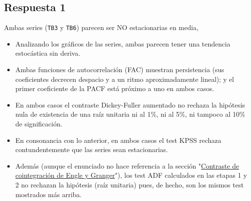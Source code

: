 \documentclass[10pt]{article}
\begin{document}
\subsection*{Respuesta 1}
\label{sec:org065ed06}

Ambas series (\texttt{TB3} y \texttt{TB6}) parecen ser NO
estacionarias en media,
\begin{itemize}
\item Analizando los gráficos de las series, ambas parecen tener una
tendencia estocástica sin deriva.

\item Ambas funciones de autocorrelación (FAC) muestran persistencia (sus
coeficientes decrecen despacio y a un ritmo aproximadamente lineal);
y el primer coeficiente de la PACF está próximo a uno en ambos
casos.

\item En ambos casos el contraste Dickey-Fuller aumentado no rechaza la
hipótesis nula de existencia de una raíz unitaria ni al 1\%, ni al
5\%, ni tampoco al 10\% de significación.

\item En consonancia con lo anterior, en ambos casos el test KPSS rechaza
contundentemente que las series sean estacionarias.

\item Además (aunque el enunciado no hace referencia a la sección
"\hyperref[sec:org4a0caf1]{Contraste de cointegración de Engle y Granger}"), los test ADF
calculados en las etapas 1 y 2 no rechazan la hipótesis (raíz
unitaria) pues, de hecho, son los mismos test mostrados más arriba.
\end{itemize}
\end{document}
